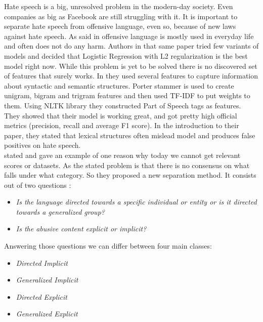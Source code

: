 \documentclass[10pt, a4paper]{article}
\begin{document}
	Hate speech is a big, unresolved problem in the modern-day society. Even companies as big as Facebook are still struggling with it. It is important to separate hate speech from offensive language, even so, because of new laws against hate speech\citep{Davidson2017AutomatedHS}. As said in \citet{Davidson2017AutomatedHS} offensive language is mostly used in everyday life and often does not do any harm. Authors in that same paper tried few variants of models and decided that Logistic Regression with L2 regularization is the best model right now.
	While this problem is yet to be solved there is no discovered set of features that surely works. In \citet{Davidson2017AutomatedHS} they used several features to capture information about syntactic and semantic structures. Porter stammer is used to create unigram, bigram and trigram features and then used TF-IDF to put weights to them. Using NLTK library they constructed Part of Speech tags as features. They showed that their model is working great, and got pretty high official metrics (precision, recall and average F1 score). In the introduction to their paper, they stated that lexical structures often mislead model and produces false positives on hate speech. \citep{Davidson2017AutomatedHS}
	\\\citet{WaseemUnderstandingAbuse} stated and gave an example of one reason why today we cannot get relevant scores or datasets. As the stated problem is that there is no consensus on what falls under what category. So they proposed a new separation method. It consists out of two questions \citep{WaseemUnderstandingAbuse}:
	\begin{itemize}
		\item \textit{Is the language directed towards a specific individual or entity or is it directed towards a generalized group?}
		\item \textit{Is the abusive content explicit or implicit?}
	\end{itemize}
	Answering those questions we can differ between four main classes:
	\begin{itemize}
		\item \textit{Directed Implicit}
		\item \textit{Generalized Implicit}
		\item \textit{Directed Explicit}
		\item \textit{Generalized Explicit}
	\end{itemize}
	
\end{document}
